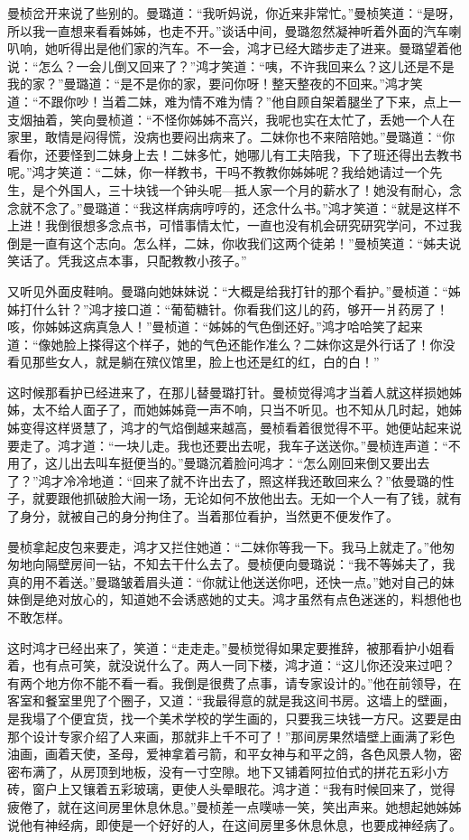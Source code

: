 \par 曼桢岔开来说了些别的。曼璐道：“我听妈说，你近来非常忙。”曼桢笑道：“是呀，所以我一直想来看看姊姊，也走不开。”谈话中间，曼璐忽然凝神听着外面的汽车喇叭响，她听得出是他们家的汽车。不一会，鸿才已经大踏步走了进来。曼璐望着他说：“怎么？一会儿倒又回来了？”鸿才笑道：“咦，不许我回来么？这儿还是不是我的家？”曼璐道：“是不是你的家，要问你呀！整天整夜的不回来。”鸿才笑道：“不跟你吵！当着二妹，难为情不难为情？”他自顾自架着腿坐了下来，点上一支烟抽着，笑向曼桢道：“不怪你姊姊不高兴，我呢也实在太忙了，丢她一个人在家里，敢情是闷得慌，没病也要闷出病来了。二妹你也不来陪陪她。”曼璐道：“你看你，还要怪到二妹身上去！二妹多忙，她哪儿有工夫陪我，下了班还得出去教书呢。”鸿才笑道：“二妹，你一样教书，干吗不教教你姊姊呢？我给她请过一个先生，是个外国人，三十块钱一个钟头呢—抵人家一个月的薪水了！她没有耐心，念念就不念了。”曼璐道：“我这样病病哼哼的，还念什么书。”鸿才笑道：“就是这样不上进！我倒很想多念点书，可惜事情太忙，一直也没有机会研究研究学问，不过我倒是一直有这个志向。怎么样，二妹，你收我们这两个徒弟！”曼桢笑道：“姊夫说笑话了。凭我这点本事，只配教教小孩子。”
\par 又听见外面皮鞋响。曼璐向她妹妹说：“大概是给我打针的那个看护。”曼桢道：“姊姊打什么针？”鸿才接口道：“葡萄糖针。你看我们这儿的药，够开一爿药房了！咳，你姊姊这病真急人！”曼桢道：“姊姊的气色倒还好。”鸿才哈哈笑了起来道：“像她脸上搽得这个样子，她的气色还能作准么？二妹你这是外行话了！你没看见那些女人，就是躺在殡仪馆里，脸上也还是红的红，白的白！”
\par 这时候那看护已经进来了，在那儿替曼璐打针。曼桢觉得鸿才当着人就这样损她姊姊，太不给人面子了，而她姊姊竟一声不响，只当不听见。也不知从几时起，她姊姊变得这样贤慧了，鸿才的气焰倒越来越高，曼桢看着很觉得不平。她便站起来说要走了。鸿才道：“一块儿走。我也还要出去呢，我车子送送你。”曼桢连声道：“不用了，这儿出去叫车挺便当的。”曼璐沉着脸问鸿才：“怎么刚回来倒又要出去了？”鸿才冷冷地道：“回来了就不许出去了，照这样我还敢回来么？”依曼璐的性子，就要跟他抓破脸大闹一场，无论如何不放他出去。无如一个人一有了钱，就有了身分，就被自己的身分拘住了。当着那位看护，当然更不便发作了。
\par 曼桢拿起皮包来要走，鸿才又拦住她道：“二妹你等我一下。我马上就走了。”他匆匆地向隔壁房间一钻，不知去干什么去了。曼桢便向曼璐说：“我不等姊夫了，我真的用不着送。”曼璐皱着眉头道：“你就让他送送你吧，还快一点。”她对自己的妹妹倒是绝对放心的，知道她不会诱惑她的丈夫。鸿才虽然有点色迷迷的，料想他也不敢怎样。
\par 这时鸿才已经出来了，笑道：“走走走。”曼桢觉得如果定要推辞，被那看护小姐看着，也有点可笑，就没说什么了。两人一同下楼，鸿才道：“这儿你还没来过吧？有两个地方你不能不看一看。我倒是很费了点事，请专家设计的。”他在前领导，在客室和餐室里兜了个圈子，又道：“我最得意的就是我这间书房。这墙上的壁画，是我塌了个便宜货，找一个美术学校的学生画的，只要我三块钱一方尺。这要是由那个设计专家介绍了人来画，那就非上千不可了！”那间房果然墙壁上画满了彩色油画，画着天使，圣母，爱神拿着弓箭，和平女神与和平之鸽，各色风景人物，密密布满了，从房顶到地板，没有一寸空隙。地下又铺着阿拉伯式的拼花五彩小方砖，窗户上又镶着五彩玻璃，更使人头晕眼花。鸿才道：“我有时候回来了，觉得疲倦了，就在这间房里休息休息。”曼桢差一点噗哧一笑，笑出声来。她想起她姊姊说他有神经病，即使是一个好好的人，在这间房里多休息休息，也要成神经病了。

